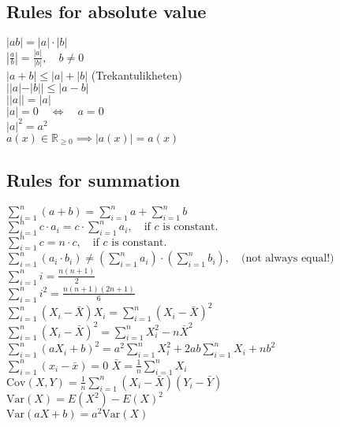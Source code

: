 \documentclass[a4paper,7pt,fleqn]{article}
\begin{document}
\begin{multicols}{3}
\begin{minipage}{\linewidth}
\end{minipage}
\begin{minipage}{\linewidth}

\subsection{Rules for absolute value} 
\(|ab| = |a| \cdot |b|\)\\
\(\left| \frac{a}{b} \right| = \frac{|a|}{|b|}, \quad b \neq 0\)\\
\(|a + b| \leq |a| + |b|\)  (Trekantulikheten)\\
\(||a| - |b|| \leq |a - b|\)\\
\(||a|| = |a|\)\\
\(|a| = 0 \quad \Leftrightarrow \quad a = 0\)\\
\(|a|^2 = a^2\)\\
\(a(x) \in \mathbb{R}_{\geq 0} \implies |a(x)| = a(x)\)\\

\end{minipage}
\begin{minipage}{\linewidth}
\subsection{Rules for summation} 

\(\sum_{i=1}^n (a + b) = \sum_{i=1}^n a + \sum_{i=1}^n b\) \\
\(\sum_{i=1}^n c \cdot a_i = c \cdot \sum_{i=1}^n a_i, \quad \text{if } c \text{ is constant.}\) \\
\(\sum_{i=1}^n c = n \cdot c, \quad \text{if } c \text{ is constant.}\) \\
\(\sum_{i=1}^n (a_i \cdot b_i) \neq \left( \sum_{i=1}^n a_i \right) \cdot \left( \sum_{i=1}^n b_i \right), \quad \text{(not always equal!)}\) \\
\(\sum_{i=1}^n i = \frac{n(n+1)}{2}\) \\
\(\sum_{i=1}^n i^2 = \frac{n(n+1)(2n+1)}{6}\) \\
\(\sum_{i=1}^n (X_i - \bar{X}) X_i = \sum_{i=1}^n (X_i - \bar{X})^2\) \\
\(\sum_{i=1}^n (X_i - \bar{X})^2 = \sum_{i=1}^n X_i^2 - n\bar{X}^2\) \\
\(\sum_{i=1}^n (a X_i + b)^2 = a^2 \sum_{i=1}^n X_i^2 + 2ab \sum_{i=1}^n X_i + nb^2\) \\
\(\sum_{i=1}^n (x_i - \bar{x}) = 0\)
\(\bar{X} = \frac{1}{n} \sum_{i=1}^n X_i\)
\(\text{Cov}(X, Y) = \frac{1}{n} \sum_{i=1}^n (X_i - \bar{X})(Y_i - \bar{Y})\) \\
\(\text{Var}(X) = E(X^2) - E(X)^2\) \\
\(\text{Var}(aX + b) = a^2 \text{Var}(X)\) \\
\end{minipage}



\end{multicols}
\end{document}
